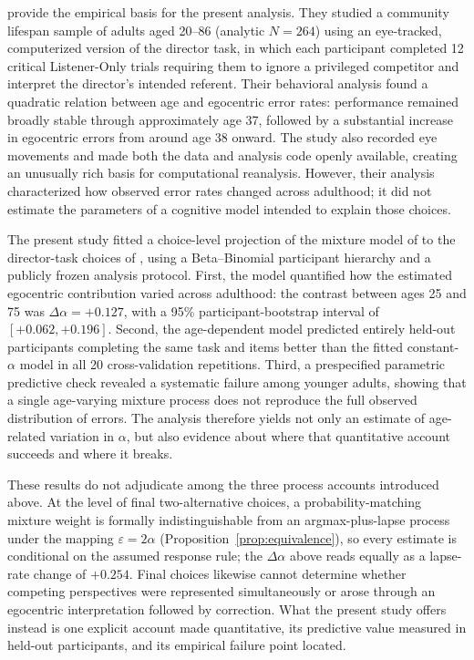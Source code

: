 \documentclass[11pt]{article}
\newcommand{\dalpha}{\ensuremath{\Delta\alpha}}
\begin{document}
\citet{bradford2023} provide the empirical basis for the present analysis. They
studied a community lifespan sample of adults aged 20--86 (analytic $N = 264$)
using an eye-tracked, computerized version of the director task, in which each
participant completed 12 critical Listener-Only trials requiring them to ignore
a privileged competitor and interpret the director's intended referent. Their
behavioral analysis found a quadratic relation between age and egocentric error
rates: performance remained broadly stable through approximately age 37,
followed by a substantial increase in egocentric errors from around age 38
onward. The study also recorded eye movements and made both the data and
analysis code openly available, creating an unusually rich basis for
computational reanalysis. However, their analysis characterized how observed
error rates changed across adulthood; it did not estimate the parameters of a
cognitive model intended to explain those choices.

The present study fitted a choice-level projection of the mixture model of
\citet{heller2016} to the director-task choices of \citet{bradford2023}, using a
Beta--Binomial participant hierarchy and a publicly frozen analysis protocol.
First, the model quantified how the estimated egocentric contribution varied
across adulthood: the contrast between ages 25 and 75 was $\dalpha = +0.127$,
with a 95\% participant-bootstrap interval of $[+0.062, +0.196]$. Second, the
age-dependent model predicted entirely held-out participants completing the same
task and items better than the fitted constant-$\alpha$ model in all 20
cross-validation repetitions. Third, a prespecified parametric predictive check
revealed a systematic failure among younger adults, showing that a single
age-varying mixture process does not reproduce the full observed distribution of
errors. The analysis therefore yields not only an estimate of age-related
variation in $\alpha$, but also evidence about where that quantitative account
succeeds and where it breaks.

These results do not adjudicate among the three process accounts introduced
above. At the level of final two-alternative choices, a probability-matching
mixture weight is formally indistinguishable from an argmax-plus-lapse process
under the mapping $\varepsilon = 2\alpha$
(Proposition~\ref{prop:equivalence}), so every estimate is conditional on the
assumed response rule; the \dalpha{} above reads equally as a lapse-rate change
of $+0.254$. Final choices likewise cannot determine whether competing
perspectives were represented simultaneously or arose through an egocentric
interpretation followed by correction. What the present study offers instead is
one explicit account made quantitative, its predictive value measured in
held-out participants, and its empirical failure point located.
\end{document}
